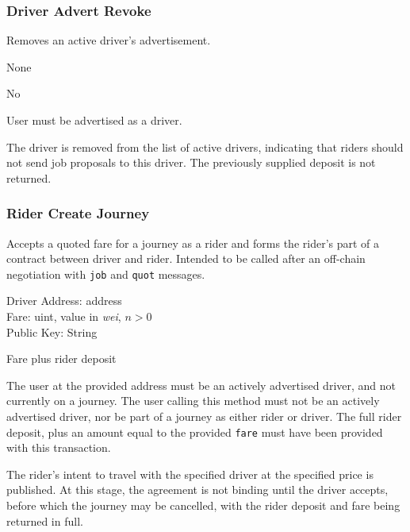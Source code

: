 
\subsubsection{Driver Advert Revoke}

\begin{description}[leftmargin=8em,style=nextline]
	\item [Description]
		Removes an active driver's advertisement.
	\item [Arguments]
		None
	\item [Payable]
		No
	\item [Preconditions]
		User must be advertised as a driver.
	\item [Postconditions]
		The driver is removed from the list of active drivers, indicating that riders should not send job proposals to this driver. The previously supplied deposit is not returned.
\end{description}

\subsubsection{Rider Create Journey}

\begin{description}[leftmargin=8em,style=nextline]
	\item [Description]
		Accepts a quoted fare for a journey as a rider and forms the rider's part of a contract between driver and rider. Intended to be called after an off-chain negotiation with \lstinline{job} and \lstinline{quot} messages.
	\item [Arguments]
		Driver Address: address \\
		Fare: uint, value in \textit{wei}\footnotemark, $n > 0$ \\
		Public Key: String
	\item [Payable]
		Fare plus rider deposit
	\item [Preconditions]
		The user at the provided address must be an actively advertised driver, and not currently on a journey. The user calling this method must not be an actively advertised driver, nor be part of a journey as either rider or driver. The full rider deposit, plus an amount equal to the provided \lstinline{fare} must have been provided with this transaction.
	\item [Postconditions]
		The rider's intent to travel with the specified driver at the specified price is published. At this stage, the agreement is not binding until the driver accepts, before which the journey may be cancelled, with the rider deposit and fare being returned in full.
\end{description}

